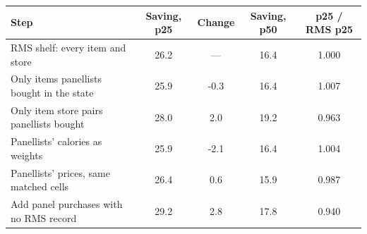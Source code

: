 \begin{tabular}{
    l
    S[table-format=2.1]
    S[table-format=-1.1]
    S[table-format=2.1]
    S[table-format=1.3]
}
\toprule
Step & {Saving, p25} & {Change} & {Saving, p50} & {p25 / RMS p25} \\
\midrule
RMS shelf: every item and store & 26.2 & {---} & 16.4 & 1.000 \\
Only items panellists bought in the state & 25.9 & -0.3 & 16.4 & 1.007 \\
Only item \texttimes{} store pairs panellists bought & 28.0 & 2.0 & 19.2 & 0.963 \\
Panellists' calories as weights & 25.9 & -2.1 & 16.4 & 1.004 \\
Panellists' prices, same matched cells & 26.4 & 0.6 & 15.9 & 0.987 \\
Add panel purchases with no RMS record & 29.2 & 2.8 & 17.8 & 0.940 \\
\bottomrule
\end{tabular}
